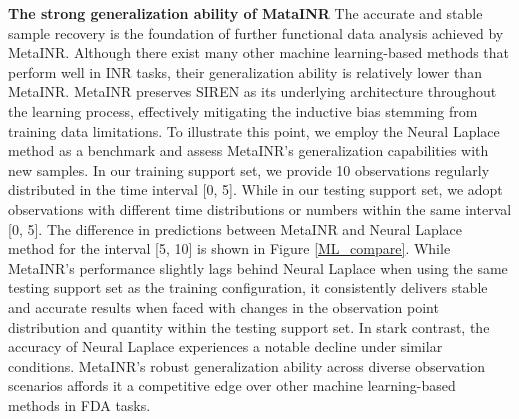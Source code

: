 \documentclass{article}
\begin{document}
\textbf{The strong generalization ability of MataINR}
The accurate and stable sample recovery is the foundation of further functional data analysis achieved by MetaINR.
Although there exist many other machine learning-based methods that perform well in INR tasks, their generalization ability is relatively lower than MetaINR. 
MetaINR preserves SIREN as its underlying architecture throughout the learning process, 
effectively mitigating the inductive bias stemming from training data limitations.
To illustrate this point, we employ the Neural Laplace method \cite{holt2022neural} as a benchmark and assess MetaINR's generalization capabilities with new samples.
In our training support set, we provide 10 observations regularly distributed in the time interval [0, 5].
While in our testing support set, we adopt observations with different time distributions or numbers within the same interval [0, 5]. 
The difference in predictions between MetaINR and Neural Laplace method for the interval [5, 10] is shown in Figure \ref{ML_compare}.
While MetaINR's performance slightly lags behind Neural Laplace when using the same testing support set as the training configuration, 
it consistently delivers stable and accurate results when faced with changes in the observation point distribution and quantity within the testing support set. 
In stark contrast, the accuracy of Neural Laplace experiences a notable decline under similar conditions.
MetaINR's robust generalization ability across diverse observation scenarios affords it a competitive edge over other machine learning-based methods in FDA tasks.

\end{document}
